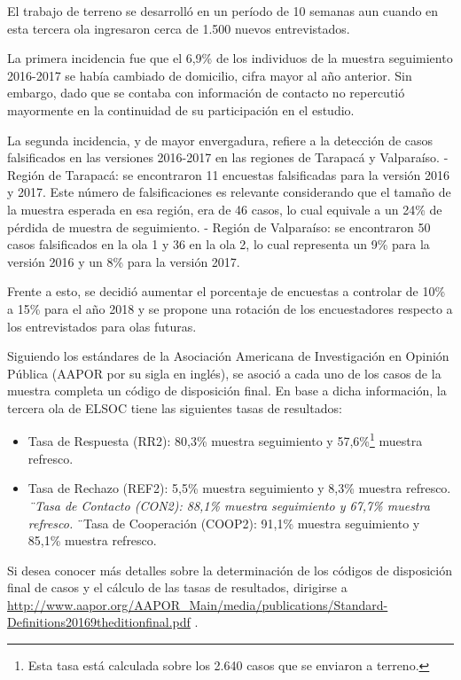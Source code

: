 \documentclass[
  openany]{book}
\providecommand{\tightlist}{%
  \setlength{\itemsep}{0pt}\setlength{\parskip}{0pt}}
\begin{document}
El trabajo de terreno se desarrolló en un período de 10 semanas aun cuando en esta tercera ola ingresaron cerca de 1.500 nuevos entrevistados.

La primera incidencia fue que el 6,9\% de los individuos de la muestra seguimiento 2016-2017 se había cambiado de domicilio, cifra mayor al año anterior. Sin embargo, dado que se contaba con información de contacto no repercutió mayormente en la continuidad de su participación en el estudio.

La segunda incidencia, y de mayor envergadura, refiere a la detección de casos falsificados en las versiones 2016-2017 en las regiones de Tarapacá y Valparaíso.
- Región de Tarapacá: se encontraron 11 encuestas falsificadas para la versión 2016 y 2017. Este número de falsificaciones es relevante considerando que el tamaño de la muestra esperada en esa región, era de 46 casos, lo cual equivale a un 24\% de pérdida de muestra de seguimiento.
- Región de Valparaíso: se encontraron 50 casos falsificados en la ola 1 y 36 en la ola 2, lo cual representa un 9\% para la versión 2016 y un 8\% para la versión 2017.

Frente a esto, se decidió aumentar el porcentaje de encuestas a controlar de 10\% a 15\% para el año 2018 y se propone una rotación de los encuestadores respecto a los entrevistados para olas futuras.

Siguiendo los estándares de la Asociación Americana de Investigación en Opinión Pública (AAPOR por su sigla en inglés), se asoció a cada uno de los casos de la muestra completa un código de disposición final. En base a dicha información, la tercera ola de ELSOC tiene las siguientes tasas de resultados:

\begin{itemize}
\tightlist
\item
  Tasa de Respuesta (RR2): 80,3\% muestra seguimiento y 57,6\%\footnote{Esta tasa está calculada sobre los 2.640 casos que se enviaron a terreno.} muestra refresco.
\item
  Tasa de Rechazo (REF2): 5,5\% muestra seguimiento y 8,3\% muestra refresco.
  \emph{¨Tasa de Contacto (CON2): 88,1\% muestra seguimiento y 67,7\% muestra refresco.
  }¨Tasa de Cooperación (COOP2): 91,1\% muestra seguimiento y 85,1\% muestra refresco.
\end{itemize}

Si desea conocer más detalles sobre la determinación de los códigos de disposición final de casos y el cálculo de las tasas de resultados, dirigirse a \url{http://www.aapor.org/AAPOR_Main/media/publications/Standard-Definitions20169theditionfinal.pdf} .
\end{document}
